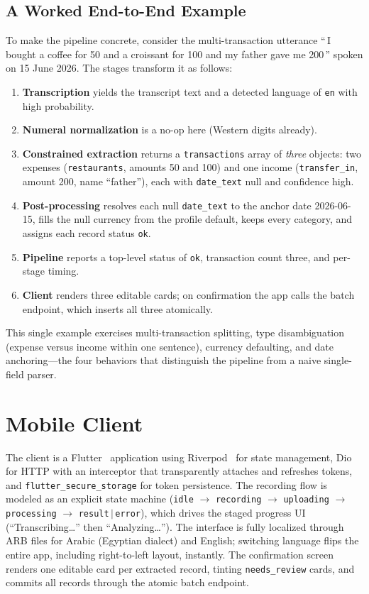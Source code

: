\subsection{A Worked End-to-End Example}

To make the pipeline concrete, consider the multi-transaction utterance
``\,I bought a coffee for 50 and a croissant for 100 and my father gave me
200\,'' spoken on 15 June 2026. The stages transform it as follows:

\begin{enumerate}[leftmargin=*]
    \item \textbf{Transcription} yields the transcript text and a detected language
    of \texttt{en} with high probability.
    \item \textbf{Numeral normalization} is a no-op here (Western digits already).
    \item \textbf{Constrained extraction} returns a \texttt{transactions} array of
    \emph{three} objects: two expenses (\texttt{restaurants}, amounts 50 and 100)
    and one income (\texttt{transfer\_in}, amount 200, name ``father''), each with
    \texttt{date\_text} null and confidence high.
    \item \textbf{Post-processing} resolves each null \texttt{date\_text} to the
    anchor date 2026-06-15, fills the null currency from the profile default,
    keeps every category, and assigns each record status \texttt{ok}.
    \item \textbf{Pipeline} reports a top-level status of \texttt{ok}, transaction
    count three, and per-stage timing.
    \item \textbf{Client} renders three editable cards; on confirmation the app
    calls the batch endpoint, which inserts all three atomically.
\end{enumerate}

This single example exercises multi-transaction splitting, type disambiguation
(expense versus income within one sentence), currency defaulting, and date
anchoring---the four behaviors that distinguish the pipeline from a naive
single-field parser.

\section{Mobile Client}

The client is a Flutter~\cite{flutter} application using Riverpod~\cite{riverpod}
for state management, Dio for HTTP with an interceptor that transparently
attaches and refreshes tokens, and \texttt{flutter\_secure\_storage} for token
persistence. The recording flow is modeled as an explicit state machine
(\texttt{idle} $\rightarrow$ \texttt{recording} $\rightarrow$ \texttt{uploading}
$\rightarrow$ \texttt{processing} $\rightarrow$ \texttt{result}\,$\mid$\,\texttt{error}),
which drives the staged progress UI (``Transcribing\ldots'' then
``Analyzing\ldots''). The interface is fully localized through ARB files for
Arabic (Egyptian dialect) and English; switching language flips the entire app,
including right-to-left layout, instantly. The confirmation screen renders one
editable card per extracted record, tinting \texttt{needs\_review} cards, and
commits all records through the atomic batch endpoint.

